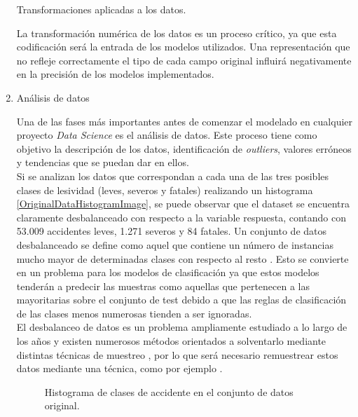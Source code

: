 \begin{enumerate}
\begin{table}[H]
                    \caption{Transformaciones aplicadas a los datos.}
                    \label{TransformacionDatosTabla}
                    \end{table} 

                La transformación numérica de los datos es un proceso crítico, ya que esta codificación será la entrada de los modelos utilizados. Una representación que no refleje correctamente el tipo de cada campo original influirá negativamente en la precisión de los modelos implementados.

                \item Análisis de datos

                    Una de las fases más importantes antes de comenzar el modelado en cualquier proyecto \textit{Data Science} es el análisis de datos. Este proceso tiene como objetivo la descripción de los datos, identificación de \textit{outliers}, valores erróneos y tendencias que se puedan dar en ellos.\\

                    Si se analizan los datos que correspondan a cada una de las tres posibles clases de lesividad (leves, severos y fatales) realizando un histograma \eqref{OriginalDataHistogramImage}, se puede observar que el dataset se encuentra claramente desbalanceado con respecto a la variable respuesta, contando con 53.009 accidentes leves, 1.271 severos y 84 fatales. Un conjunto de datos desbalanceado se define como aquel que contiene un número de instancias mucho mayor de determinadas clases con respecto al resto \cite{WhyImbalancedDataIsAProblem}. Esto se convierte en un problema para los modelos de clasificación ya que estos modelos tenderán a predecir las muestras como aquellas que pertenecen a las mayoritarias sobre el conjunto de test debido a que las reglas de clasificación de las clases menos numerosas tienden a ser ignoradas.\\

                    El desbalanceo de datos es un problema ampliamente estudiado a lo largo de los años y existen numerosos métodos orientados a solventarlo mediante distintas técnicas de muestreo \cite{ImbalancedDataReview}, por lo que será necesario remuestrear estos datos mediante una técnica, como por ejemplo .


                    \begin{figure}[H]
                        \centering
                        
                        \caption{Histograma de clases de accidente en el conjunto de datos original.}
                        \label{OriginalDataHistogramImage}
                     \end{figure}


\end{enumerate}
